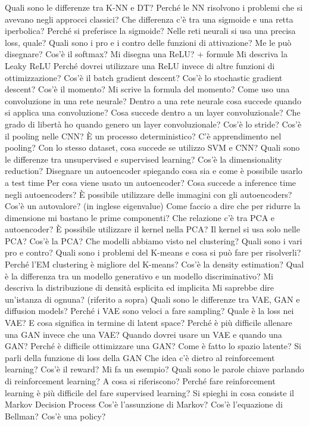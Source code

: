 Quali sono le differenze tra K-NN e DT?
Perché le NN risolvono i problemi che si avevano negli approcci classici?
Che differenza c'è tra una sigmoide e una retta iperbolica? Perché si preferisce la sigmoide?
Nelle reti neurali si usa una precisa loss, quale?
Quali sono i pro e i contro delle funzioni di attivazione? Me le può disegnare?
Cos'è il softmax?
Mi disegna una ReLU? + formule
Mi descriva la Leaky ReLU
Perché dovrei utilizzare una ReLU invece di altre funzioni di ottimizzazione?
Cos'è il batch gradient descent?
Cos'è lo stochastic gradient descent?
Cos'è il momento?
Mi scrive la formula del momento?
Come uso una convoluzione in una rete neurale?
Dentro a una rete neurale cosa succede quando si applica una convoluzione?
Cosa succede dentro a un layer convoluzionale?
Che grado di libertà ho quando genero un layer convoluzionale?
Cos'è lo stride?
Cos'è il pooling nelle CNN? È un processo deterministico?
C'è apprendimento nel pooling?
Con lo stesso dataset, cosa succede se utilizzo SVM e CNN?
Quali sono le differenze tra unsupervised e supervised learning?
Cos'è la dimensionality reduction?
Disegnare un autoencoder spiegando cosa sia e come è possibile usarlo a test time
Per cosa viene usato un autoencoder?
Cosa succede a inference time negli autoencoders?
È possibile utilizzare delle immagini con gli autoencoders?
Cos'è un autovalore? (in inglese eigenvalue)
Come faccio a dire che per ridurre la dimensione mi bastano le prime componenti?
Che relazione c'è tra PCA e autoencoder?
È possibile utilizzare il kernel nella PCA?
Il kernel si usa solo nelle PCA?
Cos'è la PCA?
Che modelli abbiamo visto nel clustering? Quali sono i vari pro e contro?
Quali sono i problemi del K-means e cosa si può fare per risolverli?
Perché l'EM clustering è migliore del K-means?
Cos'è la density estimation?
Qual è la differenza tra un modello generativo e un modello discriminativo?
Mi descriva la distribuzione di densità esplicita ed implicita
Mi saprebbe dire un'istanza di ognuna? (riferito a sopra)
Quali sono le differenze tra VAE, GAN e diffusion models? Perché i VAE sono veloci a fare sampling?
Quale è la loss nei VAE? E cosa significa in termine di latent space?
Perché è più difficile allenare una GAN invece che una VAE?
Quando dovrei usare un VAE e quando una GAN?
Perché è difficile ottimizzare una GAN?
Come è fatto lo spazio latente?
Si parli della funzione di loss della GAN
Che idea c'è dietro al reinforcement learning? Cos'è il reward? Mi fa un esempio?
Quali sono le parole chiave parlando di reinforcement learning? A cosa si riferiscono?
Perché fare reinforcement learning è più difficile del fare supervised learning?
Si spieghi in cosa consiste il Markov Decision Process
Cos'è l'assunzione di Markov?
Cos'è l'equazione di Bellman?
Cos'è una policy?